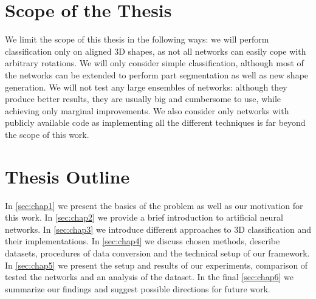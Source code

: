 \section{Scope of the Thesis}
We limit the scope of this thesis in the following ways: we will perform classification only on aligned 3D shapes, as not all networks can easily cope with arbitrary rotations. We will only consider simple classification, although most of the networks can be extended to perform part segmentation as well as new shape generation. We will not test any large ensembles of networks: although they produce better results, they are usually big and cumbersome to use, while achieving only marginal improvements. We also consider only networks with publicly available code as implementing all the different techniques is far beyond the scope of this work.

\section{Thesis Outline}
In \autoref{sec:chap1} we present the basics of the problem as well as our motivation for this work. In \autoref{sec:chap2} we provide a brief introduction to artificial neural networks. In  \autoref{sec:chap3} we introduce different approaches to 3D classification and their implementations. In \autoref{sec:chap4} we discuss chosen methods, describe datasets, procedures of data conversion and the technical setup of our framework. In  \autoref{sec:chap5} we present the setup and results of our experiments, comparison of tested the networks and an analysis of the dataset. In the final  \autoref{sec:chap6} we summarize our findings and suggest possible directions for future work.
